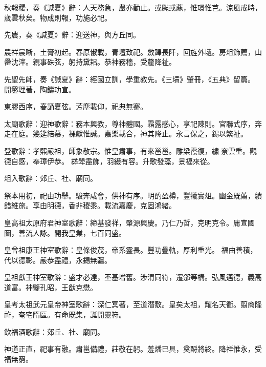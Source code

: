 \begin{pinyinscope}
 秋報稷，奏《諴夏》辭：人天務急，農亦勤止。或颭或藨，惟璟惟芑。涼風戒時，歲雲秋矣。物成則報，功施必祀。



 先農，奏《諴夏》辭：迎送神，與方丘同。



 農祥晨晰，土膏初起。春原俶載，青壇致祀。斂蹕長阡，回旌外壝。房俎飾薦，山罍沈滓。親事硃弦，躬持黛耜。恭神務穡，受釐降祉。



 先聖先師，奏《諴夏》辭：經國立訓，學重教先。《三墳》肇冊，《五典》留篇。
 開鑿理著，陶鑄功宣。



 東膠西序，春誦夏弦。芳塵載仰，祀典無騫。



 太廟歌辭：迎神歌辭：務本興教，尊神體國。霜露感心，享祀陳則。官聯式序，奔走在庭。幾筵結慕，裸獻惟誠。嘉樂載合，神其降止。永言保之，錫以繁祉。



 登歌辭：孝熙嚴祖，師象敬宗。惟皇肅事，有來邕邕。雕梁霞復，繡尞雲重。觀德自感，奉璋伊恭。
 彞斝盡飾，羽綴有容。升歌發藻，景福來從。



 俎入歌辭：郊丘、社、廟同。



 祭本用初，祀由功舉。駿奔咸會，供神有序。明酌盈樽，豐犧實俎。幽金既薦，繢錯維旅。享由明德，香非稷黍。載流嘉慶，克固鴻緒。



 皇高祖太原府君神室歌辭：締基發祥，肇源興慶。乃仁乃哲，克明克令。庸宣國圖，善流人詠。開我皇業，七百同盛。



 皇曾祖康王神室歌辭：皇條俊茂，帝系靈長。豐功疊軌，厚利重光。
 福由善積，代以德彰。嚴恭盡禮，永錫無疆。



 皇祖獻王神室歌辭：盛才必達，丕基增舊。涉渭同符，遷邠等構。弘風邁德，義高道富。神鑒孔昭，王猷克懋。



 皇考太祖武元皇帝神室歌辭：深仁冥著，至道潛敷。皇矣太祖，耀名天衢。翦商隆祚，奄宅隋區。有命既集，誕開靈符。



 飲福酒歌辭：郊丘、社、廟同。



 神道正直，祀事有融。肅邕備禮，莊敬在躬。羞燔已具，奠酹將終。降祥惟永，受福無窮。




\end{pinyinscope}
